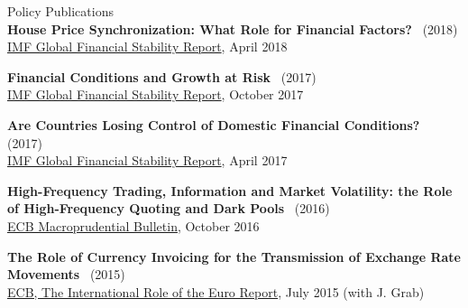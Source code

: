 \documentclass[usegeometry, 10pt, a4paper]{cv} %
\newcommand{\activite}[1]{\textbf{#1}\ }
\begin{document}
\begin{rubriquetableau}[0.95\textwidth]{Policy Publications}\\
 
\activite{House Price Synchronization: What Role for Financial Factors?} (2018) \\
\hspace{0.6cm}
\small{\href{https://www.elibrary.imf.org/view/IMF082/24893-9781484338292/24893-9781484338292/ch03}{IMF
    Global Financial Stability Report}, April 2018}
\vspace{0.4cm} 


\activite{Financial Conditions and Growth at Risk} (2017) \\
\hspace{0.6cm}
\small{\href{https://www.imf.org/en/Publications/GFSR/Issues/2017/09/27/global-financial-stability-report-october-2017}{IMF
    Global Financial Stability Report}, October
  2017}
\vspace{0.4cm} 


\activite{Are Countries Losing Control of Domestic Financial Conditions?} (2017) \\
\hspace{0.6cm}
\small{\href{https://www.imf.org/~/media/Files/Publications/GFSR/2017/April/ch3.ashx}{IMF
    Global Financial Stability Report}, April
  2017}
\vspace{0.4cm} 


\activite{High-Frequency Trading, Information and Market Volatility: the Role of High-Frequency
  Quoting and Dark Pools} (2016) \\
\hspace{0.6cm} \small{\href{https://ideas.repec.org/a/ecb/ecbmbu/201600023.html}{ECB Macroprudential Bulletin}, October 2016}
\vspace{0.4cm} 


\activite{The Role of Currency Invoicing for the Transmission of Exchange Rate Movements} (2015) \\
\hspace{0.6cm} \small{\href{https://www.ecb.europa.eu/pub/pdf/ire/euro-international-role-201507.en.pdf}{ECB, The International Role of the Euro Report}, July 2015 (with J. Grab)}
\end{rubriquetableau}


\newpage


\end{document}

